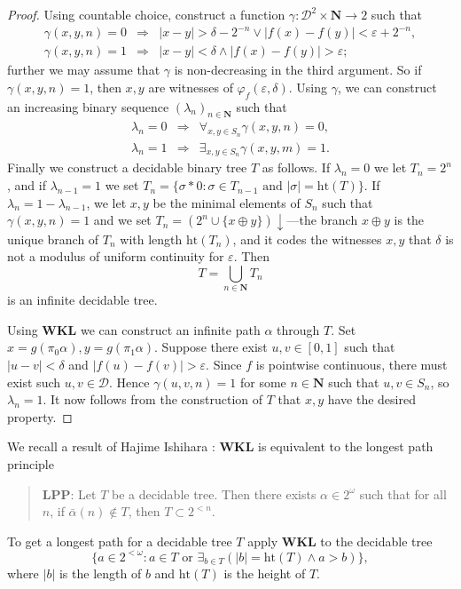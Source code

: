 \documentclass[11pt]{amsart}
\begin{document}
\begin{proof}
Using countable choice, construct a function $\gamma:\mathcal{D}^2\times\mathbf{N}\rightarrow2$ such that
 \begin{eqnarray*}
  \gamma(x,y,n)=0 & \Rightarrow & |x-y|>\delta-2^{-n} \vee |f(x)-f(y)|<\varepsilon+2^{-n},\\
  \gamma(x,y,n)=1 & \Rightarrow & |x-y|<\delta \wedge |f(x)-f(y)|>\varepsilon;
 \end{eqnarray*}
\noindent
further we may assume that $\gamma$ is non-decreasing in the third argument. So if $\gamma(x,y,n)=1$, then $x, y$ are witnesses of $\varphi_f(\varepsilon,\delta)$.
Using $\gamma$, we can construct an increasing binary sequence $(\lambda_n)_{n\in\mathbf{N}}$ such that 
 \begin{eqnarray*}
  \lambda_n=0 & \Rightarrow & \forall_{x,y\in S_n}\gamma(x,y,n)=0,\\
  \lambda_n=1 & \Rightarrow & \exists_{x,y\in S_n}\gamma(x,y,m)=1.
 \end{eqnarray*}
\noindent
Finally we construct a decidable binary tree $T$ as follows. If $\lambda_n=0$ we let $T_n=2^n$, and if $\lambda_{n-1}=1$ we set $T_n=\{\sigma*0:\sigma\in T_{n-1}\mbox{ and }|\sigma|=\mathrm{ht}(T)\}$. If $\lambda_n=1-\lambda_{n-1}$, we let $x,y$ be the minimal elements of $S_n$ such that $\gamma(x,y,n)=1$  and we set $T_n=(2^n\cup\{x\oplus y\})\downarrow$---the branch $x\oplus y$ is the unique branch of $T_n$ with length $\mathrm{ht}(T_n)$, and it codes the witnesses $x,y$ that $\delta$ is not a modulus of uniform continuity for $\varepsilon$. Then
 $$
 T=\bigcup_{n\in\mathbf{N}} T_n
 $$
\noindent
is an infinite decidable tree.

\bigskip
\noindent
Using \textbf{WKL} we can construct an infinite path $\alpha$ through $T$. Set $x=g(\pi_0\alpha),y=g(\pi_1\alpha)$. Suppose there exist $u,v\in[0,1]$ such that $|u-v|<\delta$ and $|f(u)-f(v)|>\varepsilon$. Since $f$ is pointwise continuous, there must exist such $u,v\in \mathcal{D}$. Hence $\gamma(u,v,n)=1$ for some $n\in\mathbf{N}$ such that $u,v\in S_n$, so $\lambda_n=1$. It now follows from the construction of $T$ that $x,y$ have the desired property.
\end{proof}

\bigskip
\noindent
We recall a result of Hajime Ishihara \cite{Ish}: \textbf{WKL} is equivalent to the longest path principle
 \begin{quote}
  \textbf{LPP}: Let $T$ be a decidable tree. Then there exists $\alpha\in2^\omega$ such that for all $n$, if $\bar{\alpha}(n)\notin T$, then $T\subset2^{<n}$.
 \end{quote}
To get a longest path for a decidable tree $T$ apply \textbf{WKL} to the decidable  tree
 $$
  \{a\in2^{<\omega}: a\in T \mbox{ or } \exists_{b \in T}(\vert b\vert = \mathrm{ht}(T) \wedge a > b)\},
 $$
where $\vert b\vert$ is the length of $b$ and $\mathrm{ht}(T)$ is the height of $T$.
\end{document}
